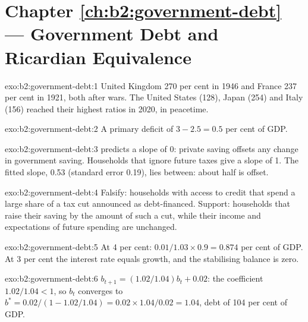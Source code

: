 \section*{Chapter \ref{ch:b2:government-debt} --- Government Debt and Ricardian Equivalence}

\begin{solution}{exo:b2:government-debt:1}
United Kingdom 270 per cent in 1946 and France 237 per cent in 1921, both after wars. The United States (128), Japan (254) and Italy (156) reached their highest
ratios in 2020, in peacetime.
\end{solution}

\begin{solution}{exo:b2:government-debt:2}
A primary deficit of $3 - 2.5 = 0.5$ per cent of GDP.
\end{solution}

\begin{solution}{exo:b2:government-debt:3}
 predicts a slope of 0: private saving offsets any change in government saving. Households that
ignore future taxes give a slope of 1. The fitted slope, 0.53 (standard error 0.19), lies between: about half is offset.
\end{solution}

\begin{solution}{exo:b2:government-debt:4}
Falsify: households with access to credit that spend a large share of a tax cut announced as debt-financed. Support:
households that raise their saving by the amount of such a cut, while their income and expectations of future
spending are unchanged.
\end{solution}

\begin{solution}{exo:b2:government-debt:5}
At 4 per cent: $0.01/1.03 \times 0.9 = 0.874$ per cent of GDP. At 3 per cent the interest rate equals growth, and the stabilising balance is zero.
\end{solution}

\begin{solution}{exo:b2:government-debt:6}
$b_{t+1} = (1.02/1.04)b_t + 0.02$: the coefficient $1.02/1.04 < 1$, so $b_t$ converges to $b^* = 0.02/(1 - 1.02/1.04) = 0.02 \times 1.04/0.02 = 1.04$, debt of 104 per cent of GDP.
\end{solution}

